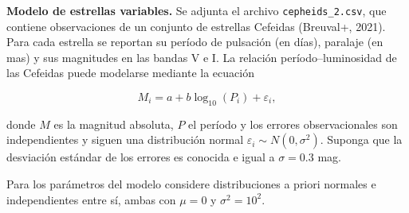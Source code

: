 \documentclass[12pt]{article}
\begin{document}
\textbf{Modelo de estrellas variables.} Se adjunta el archivo \texttt{cepheids\_2.csv}, que contiene observaciones de un conjunto de estrellas Cefeidas (Breuval+, 2021). Para cada estrella se reportan su período de pulsación (en días), paralaje (en mas) y sus magnitudes en las bandas V e I. La relación período--luminosidad de las Cefeidas puede modelarse mediante la ecuación

$$
M_i = a + b \log_{10}(P_i) + \varepsilon_i,
$$

donde $M$ es la magnitud absoluta, $P$ el período y los errores observacionales son independientes y siguen una distribución normal $\varepsilon_i \sim N(0, \sigma^2)$. Suponga que la desviación estándar de los errores es conocida e igual a $\sigma = 0.3$ mag.

Para los parámetros del modelo considere distribuciones a priori normales e independientes entre sí, ambas con $\mu = 0$ y $\sigma^2 = 10^2$.
\end{document}
